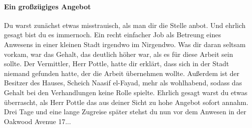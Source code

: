 \paragraph{Ein großzügiges Angebot}

Du warst zunächst etwas misstrauisch, als man dir die Stelle anbot.
Und ehrlich gesagt bist du es immernoch.
Ein recht einfacher Job als Betreung eines Anwesens in einer kleinen Stadt irgendwo im Nirgendwo.
Was dir daran seltsam vorkam, war das Gehalt, das deutlich höher war, als es für diese Arbeit sein sollte.
Der Vermittler, Herr Pottle, hatte dir erklärt, dass sich in der Stadt niemand gefunden hatte, der die Arbeit übernehmen wollte.
Außerdem ist der Besitzer des Hauses, Scheich Naasif el-Fayad, mehr als wohlhabend, sodass das Gehalt bei den Verhandlungen keine Rolle spielte.
Ehrlich gesagt warst du etwas überrascht, als Herr Pottle das aus deiner Sicht zu hohe Angebot sofort annahm. 
Drei Tage und eine lange Zugreise später stehst du nun vor dem Anwesen in der Oakwood Avenue 17...
